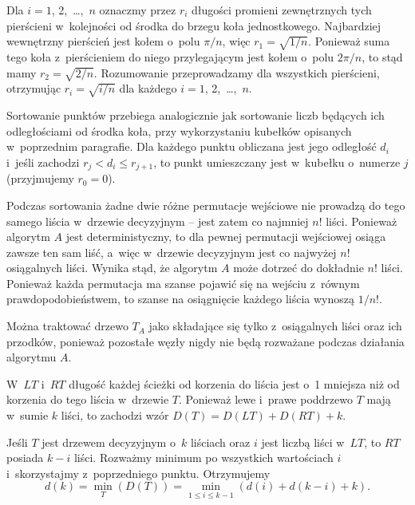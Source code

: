 Dla $i=1$, 2,~\dots,~$n$ oznaczmy przez $r_i$ długości promieni zewnętrznych tych pierścieni w~kolejności od środka do brzegu koła jednostkowego. Najbardziej wewnętrzny pierścień jest kołem o~polu $\pi/n$, więc $r_1=\sqrt{1/n}$. Ponieważ suma tego koła z~pierścieniem do niego przylegającym jest kołem o~polu $2\pi/n$, to stąd mamy $r_2=\sqrt{2/n}$. Rozumowanie przeprowadzamy dla wszystkich pierścieni, otrzymując $r_i=\sqrt{i/n}$ dla każdego $i=1$, 2,~\dots,~$n$.

Sortowanie punktów przebiega analogicznie jak sortowanie liczb będących ich odległościami od środka koła, przy wykorzystaniu kubełków opisanych w~poprzednim paragrafie. Dla każdego punktu obliczana jest jego odległość $d_i$ i~jeśli zachodzi $r_j<d_i\le r_{j+1}$, to punkt umieszczany jest w~kubełku o~numerze $j$ (przyjmujemy $r_0=0$).

\exercise %

\problems


\subproblem %
Podczas sortowania żadne dwie różne permutacje wejściowe nie prowadzą do tego samego liścia w~drzewie decyzyjnym -- jest zatem co najmniej $n!$ liści. Ponieważ algorytm $A$ jest deterministyczny, to dla pewnej permutacji wejściowej osiąga zawsze ten sam liść, a~więc w~drzewie decyzyjnym jest co najwyżej $n!$ osiągalnych liści. Wynika stąd, że algorytm $A$ może dotrzeć do dokładnie $n!$ liści. Ponieważ każda permutacja ma szanse pojawić się na wejściu z~równym prawdopodobieństwem, to szanse na osiągnięcie każdego liścia wynoszą $1/n!$.

Można traktować drzewo $T_A$ jako składające się tylko z~osiągalnych liści oraz ich przodków, ponieważ pozostałe węzły nigdy nie będą rozważane podczas działania algorytmu $A$.

\subproblem %
W~$LT$ i~$RT$ długość każdej ścieżki od korzenia do liścia jest o~1 mniejsza niż od korzenia do tego liścia w~drzewie $T$. Ponieważ lewe i~prawe poddrzewo $T$ mają w~sumie $k$ liści, to zachodzi wzór $D(T)=D(LT)+D(RT)+k$.

\subproblem %
Jeśli $T$ jest drzewem decyzyjnym o~$k$ liściach oraz $i$ jest liczbą liści w~$LT$, to $RT$ posiada $k-i$ liści. Rozważmy minimum po wszystkich wartościach $i$ i~skorzystajmy z~poprzedniego punktu. Otrzymujemy
\[
	d(k) = \min_T(D(T)) = \min_{1\le i\le k-1}(d(i)+d(k-i)+k).
\]

